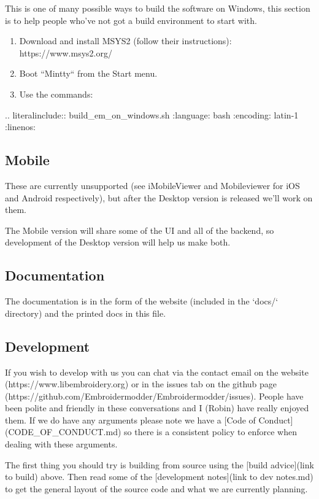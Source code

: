 \documentclass[11pt]{report}
\begin{document}
This is one of many possible ways to build the software on Windows,
this section is to help people who've not got a build environment to start with.

\begin{enumerate}
\item Download and install MSYS2 (follow their instructions): https://www.msys2.org/
\item Boot ``Mintty`` from the Start menu.
\item Use the commands:
\end{enumerate}

.. literalinclude:: build\_em\_on\_windows.sh
   :language: bash
   :encoding: latin-1
   :linenos:

\subsection{Mobile}

These are currently unsupported (see iMobileViewer and Mobileviewer for
iOS and Android respectively), but after the Desktop version is
released we'll work on them.

The Mobile version will share some of the UI and all of the backend,
so development of the Desktop version will help us make both.

\subsection{Documentation}

The documentation is in the form of the website (included in the `docs/`
directory) and the printed docs in this file.

\subsection{Development}

If you wish to develop with us you can chat via the contact email
on the website (https://www.libembroidery.org) or in the issues tab on the
github page (https://github.com/Embroidermodder/Embroidermodder/issues).
People have been polite and friendly in these conversations and I (Robin)
have really enjoyed them.
If we do have any arguments please note we have a
[Code of Conduct](CODE\_OF\_CONDUCT.md) so there is a consistent policy to
enforce when dealing with these arguments.

The first thing you should try is building from source using the [build advice](link to build)
above. Then read some of the [development notes](link to dev notes.md) to get the general
layout of the source code and what we are currently planning.
\end{document}
